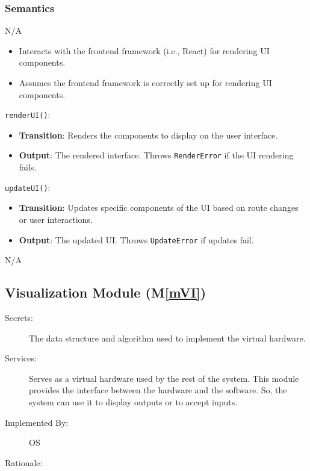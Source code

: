\documentclass[12pt, titlepage]{article}
\newcommand{\mref}[1]{M\ref{#1}}
\begin{document}
\subsubsection{Semantics}
\begin{description}
  \item[State Variables:] N/A
  
  \item[Environment Variables:]
  \item
  \begin{itemize}
    \item Interacts with the frontend framework (i.e., React) for rendering UI components.
  \end{itemize}
  
  \item[Assumptions:]
  \item
  \begin{itemize}
    \item Assumes the frontend framework is correctly set up for rendering UI components.
  \end{itemize}
  
  \item[Access Routine Semantics:] 
  \item \texttt{renderUI()}:
  \begin{itemize}
    \item \textbf{Transition}: Renders the components to display on the user interface.
    \item \textbf{Output}: The rendered interface. Throws \texttt{RenderError} if the UI rendering fails.
  \end{itemize}
  
  \item \texttt{updateUI()}:
  \begin{itemize}
    \item \textbf{Transition}: Updates specific components of the UI based on route changes or user interactions.
    \item \textbf{Output}: The updated UI. Throws \texttt{UpdateError} if updates fail.
  \end{itemize}
  
  \item[Local Function:] N/A
\end{description}

\subsection{Visualization Module (\mref{mVI})}
\begin{description}
  \item[Secrets:]The data structure and algorithm used to implement the virtual
    hardware.
  \item[Services:]Serves as a virtual hardware used by the rest of the
    system. This module provides the interface between the hardware and the
    software. So, the system can use it to display outputs or to accept inputs.
  \item[Implemented By:] OS
  \item[Rationale:] 
\end{description}
\end{document}
